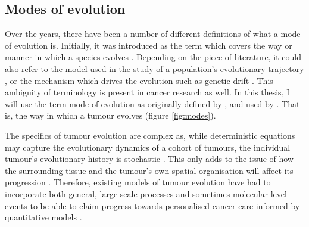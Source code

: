\subsection{Modes of evolution}
Over the years, there have been a number of different definitions of what a
mode of evolution is. Initially, it was introduced as the term which covers the
way or manner in which a species evolves \cite{eiseley_tempo_1945}. Depending
on the piece of literature, it could also refer to the model used in the study
of a population's evolutionary trajectory \cite{yotoko_does_2011}, or the
mechanism which drives the evolution such as genetic drift
\cite{glassman_cancer_1996, wolf_genome_2013}. This ambiguity of terminology is
present in cancer research as well. In this thesis, I will use the term mode of
evolution as originally defined by \cite{eiseley_tempo_1945}, and used by
\cite{davis_tumor_2017, noble_spatial_2022}. That is, the way in which a tumour
evolves (figure \ref{fig:modes}). \par
The specifics of tumour evolution are complex as, while deterministic equations
may capture the evolutionary dynamics of a cohort of tumours, the individual
tumour's evolutionary history is stochastic \cite{werner_deterministic_2013}.
This only adds to the issue of how the surrounding tissue
\cite{west_normal_2021} and the tumour's own spatial organisation will affect
its progression \cite{noble_spatial_2022, li_mutation_2023}. Therefore,
existing models of tumour evolution have had to incorporate both general,
large-scale processes and sometimes molecular level events to be able to claim
progress towards personalised cancer care informed by quantitative models
\cite{yin_review_2019}. \par

